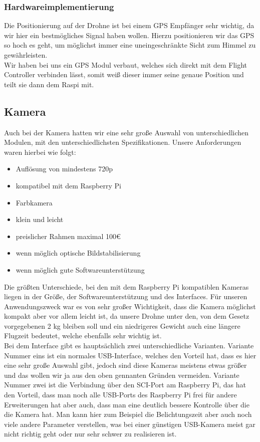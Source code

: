 \subsubsection{Hardwareimplementierung}
Die Positionierung auf der Drohne ist bei einem GPS Empfänger sehr wichtig, da wir hier ein bestmögliches Signal haben wollen. Hierzu positionieren wir das GPS so hoch es geht, um möglichst immer eine uneingeschränkte Sicht zum Himmel zu gewährleisten.\\
Wir haben bei uns ein GPS Modul verbaut, welches sich direkt mit dem Flight Controller verbinden lässt, somit weiß dieser immer seine genaue Position und teilt sie dann dem Raspi mit.

\subsection{Kamera}\label{kamera}
Auch bei der Kamera hatten wir eine sehr große Auswahl von unterschiedlichen Modulen, mit den unterschiedlichsten Spezifikationen. Unsere Anforderungen waren hierbei  wie folgt:
\begin{itemize}
	\item Auflösung von mindestens 720p
	\item kompatibel mit dem Raspberry Pi
	\item Farbkamera
	\item klein und leicht
	\item preislicher Rahmen maximal 100€
	\item wenn möglich optische Bildstabilisierung
	\item wenn möglich gute Softwareunterstützung
\end{itemize}
Die größten Unterschiede, bei den mit dem Raspberry Pi kompatiblen Kameras liegen in der Größe, der Softwareunterstützung und des Interfaces. Für unseren Anwendungszweck war es von sehr großer Wichtigkeit, dass die Kamera möglichst kompakt aber vor allem leicht ist, da unsere Drohne unter den, von dem Gesetz vorgegebenen 2 kg bleiben soll und ein niedrigeres Gewicht auch eine längere Flugzeit bedeutet, welche ebenfalls sehr wichtig ist.\\
Bei dem Interface gibt es hauptsächlich zwei unterschiedliche Varianten. Variante Nummer eins ist ein normales USB-Interface, welches den Vorteil hat, dass es hier eine sehr große Auswahl gibt, jedoch sind diese Kameras meistens etwas größer und das wollen wir ja aus den oben gennanten Gründen vermeiden. Variante Nummer zwei ist die Verbindung über den SCI-Port am Raspberry Pi, das hat den Vorteil, dass man noch alle USB-Ports des Raspberry Pi frei für andere Erweiterungen hat aber auch, dass man eine deutlich bessere Kontrolle über die die Kamera hat. Man kann hier zum Beispiel die Belichtungszeit aber auch noch viele andere Parameter verstellen, was bei einer günstigen USB-Kamera meist gar nicht richtig geht oder nur sehr schwer zu realisieren ist.\\

